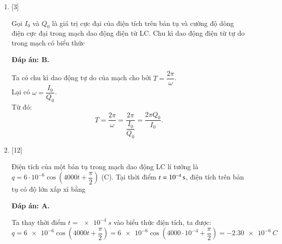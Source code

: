 \begin{enumerate}[label=\bfseries Câu \arabic*:]
{	}
	
	\item {} [3]
	
	{Gọi $I_0$ và $Q_0$ là giá trị cực đại của điện tích trên bản tụ và cường độ dòng điện cực đại trong mạch dao động điện từ LC. Chu kì dao động điện từ tự do trong mạch có biểu thức
	}
	
	\hideall
	{		\textbf{Đáp án: B.}
		
		Ta có chu kì dao động tự do của mạch cho bởi $T = \dfrac{2\pi}{\omega}$. \\
		Lại có $\omega = \dfrac{I_0}{Q_0}$. \\
		Từ đó:
		$$T = \dfrac{2\pi}{\omega} = \dfrac{2\pi}{\dfrac{I_0}{Q_0}} = \dfrac{2\pi Q_0}{I_0}.$$
		
	}
	
	\item {} [12]
	
	{Điện tích của một bản tụ trong mạch dao động LC lí tưởng là $q = 6\cdot10^{-6} \cos \left( 4000t + \dfrac{\pi}{2} \right)$ (C). Tại thời điểm $t = \xsi{10^{-4}}{s}$, điện tích trên bản tụ có độ lớn xấp xỉ bằng 
	}
	
	\hideall
	{		\textbf{Đáp án: A.}
		
		Ta thay thời điểm $t = \SI{e-4}{s}$ vào biểu thức điện tích, ta được:
		$$
		q = \num{6e-6} \cos \left( 4000t + \dfrac{\pi}{2} \right) = \num{6e-6}\cos \left( 4000\cdot10^{-4} + \dfrac{\pi}{2} \right) = -\SI{2,30 e-6}{C}
		$$
		
}
\end{enumerate}
